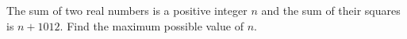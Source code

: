 The sum of two real numbers is a positive integer $n$ and the sum of their squares is $n+1012$. Find the maximum possible value of $n$.
